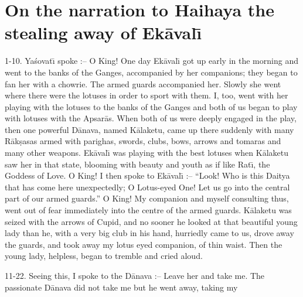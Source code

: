 \chapter{On the narration to Haihaya the stealing away of Ek\=aval\={\i}}

1-10. Ya\'sovat\={\i} spoke :-- O King! One day Ek\=aval\={\i} got up early in the morning and went to the banks of the Ganges, accompanied by her companions; they began to fan her with a chowrie. The armed guards accompanied her. Slowly she went where there were the lotuses in order to sport with them. I, too, went with her playing with the lotuses to the banks of the Ganges and both of us began to play with lotuses with the Apsar\=as. When both of us were deeply engaged in the play, then one powerful D\=anava, named K\=alaketu, came up there suddenly with many R\=ak\d{s}asas armed with parighas, swords, clubs, bows, arrows and tomaras and many other weapons. Ek\=aval\={\i} was playing with the best lotuses when K\=alaketu saw her in that state, blooming with beauty and youth as if like Rat\={\i}, the Goddess of Love. O King! I then spoke to Ek\=aval\={\i} :-- ``Look! Who is this Daitya that has come here unexpectedly; O Lotus-eyed One! Let us go into the central part of our armed guards.'' O King! My companion and myself consulting thus, went out of fear immediately into the centre of the armed guards. K\=alaketu was seized with the arrows of Cupid, and no sooner he looked at that beautiful young lady than he, with a very big club in his hand, hurriedly came to us, drove away the guards, and took away my lotus eyed companion, of thin waist. Then the young lady, helpless, began to tremble and cried aloud.

11-22. Seeing this, I spoke to the D\=anava :-- Leave her and take me. The passionate D\=anava did not take me but he went away, taking my


